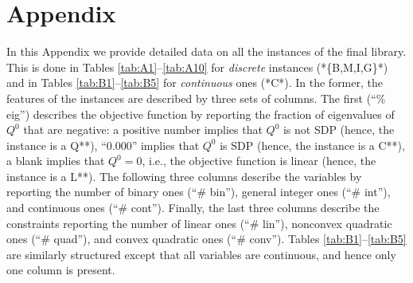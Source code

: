 
\section*{Appendix}\label{sec:appendix}

In this Appendix we provide detailed data on all the instances of the final library. This is done in Tables \ref{tab:A1}--\ref{tab:A10} for \emph{discrete} instances (*\{B,M,I,G\}*) and in Tables \ref{tab:B1}--\ref{tab:B5} for \emph{continuous} ones (*C*). In the former, the features of the instances are described by three sets of columns. The first (``\% eig'') describes the objective function by reporting the fraction of eigenvalues of $Q^0$ that are negative: a positive number implies that $Q^0$ is not SDP (hence, the instance is a Q**), ``0.000'' implies that $Q^0$ is SDP (hence, the instance is a C**), a blank implies that $Q^0 = 0$, i.e., the objective function is linear (hence, the instance is a L**). The following three columns describe the variables by reporting the number of binary ones (``\# bin''), general integer ones (``\# int''), and continuous ones (``\# cont''). Finally, the last three columns describe the constraints reporting the number of linear ones (``\# lin''), nonconvex quadratic ones (``\# quad''), and convex quadratic ones (``\# conv''). Tables \ref{tab:B1}--\ref{tab:B5} are similarly structured except that all variables are continuous, and hence only one column is present.

